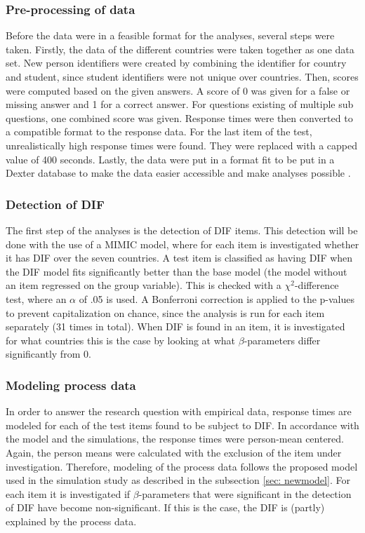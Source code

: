 \documentclass{interact}
\begin{document}
\subsubsection{Pre-processing of data}
Before the data were in a feasible format for the analyses, several steps were taken. Firstly, the data of the different countries were taken together as one data set. New person identifiers were created by combining the identifier for country and student, since student identifiers were not unique over countries. Then, scores were computed based on the given answers. A score of 0 was given for a false or missing answer and 1 for a correct answer. For questions existing of multiple sub questions, one combined score was given. Response times were then converted to a compatible format to the response data. For the last item of the test, unrealistically high response times were found. They were replaced with a capped value of 400 seconds. Lastly, the data were put in a format fit to be put in a Dexter database to make the data easier accessible and make analyses possible \parencite{maris2018dexter}. 

\subsubsection{Detection of DIF}
The first step of the analyses is the detection of DIF items. This detection will be done with the use of a MIMIC model, where for each item is investigated whether it has DIF over the seven countries. A test item is classified as having DIF when the DIF model fits significantly better than the base model (the model without an item regressed on the group variable). This is checked with a $\chi^2$-difference test, where an $\alpha$ of .05 is used. A Bonferroni correction is applied to the p-values to prevent capitalization on chance, since the analysis is run for each item separately (31 times in total). When DIF is found in an item, it is investigated for what countries this is the case by looking at what $\beta$-parameters differ significantly from 0.

\subsubsection{Modeling process data}
In order to answer the research question with empirical data, response times are modeled for each of the test items found to be subject to DIF. In accordance with the model and the simulations, the response times were person-mean centered. Again, the person means were calculated with the exclusion of the item under investigation. Therefore, modeling of the process data follows the proposed model used in the simulation study as described in the subsection \ref{sec: newmodel}. For each item it is investigated if $\beta$-parameters that were significant in the detection of DIF have become non-significant. If this is the case, the DIF is (partly) explained by the process data. 
\end{document}
